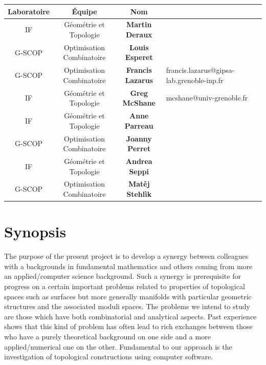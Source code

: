 \documentclass[14pt,fleqn]{article}
\begin{document}
\smallskip
\vspace{.5cm}
\begin{center}
\begin{tabular}[h]{|c|c|c|l|l|}
  \hline
 Laboratoire & Équipe & Nom \\
\hline \hline
IF & Géométrie et Topologie & {\bf Martin Deraux} &\\
\hline
G-SCOP & Optimisation Combinatoire & {\bf Louis Esperet}& \\
\hline
G-SCOP & Optimisation Combinatoire & {\bf Francis Lazarus}& 
francis.lazarus@gipsa-lab.grenoble-inp.fr\\
\hline
IF & Géométrie et Topologie & {\bf Greg McShane}&
mcshane@univ-grenoble.fr \\
\hline
IF & Géométrie et Topologie & {\bf Anne Parreau}& \\
\hline
G-SCOP & Optimisation Combinatoire & {\bf Joanny Perret}& \\
\hline
IF & Géométrie et Topologie & {\bf Andrea Seppi}& \\
\hline
G-SCOP & Optimisation Combinatoire & {\bf Mat\v{e}j Stehlìk}& \\
\hline
\end{tabular}
\end{center}

\section{Synopsis}


The purpose of the present project is to develop a synergy between colleagues with a backgrounds in fundamental mathematics  and others coming from more an applied/computer science background.
Such a synergy is prerequisite 
for progress on a certain important problems related to properties of topological spaces 
such as surfaces but more generally manifolds with particular geometric structures
and the associated moduli spaces.
The problems we intend to study
are those which have both 
combinatorial and analytical aspects. Past experience shows that
this kind of problem 
has often lead to rich exchanges between 
those  
who have a purely theoretical background 
on one side 
and a more  applied/numerical one
on the other.
Fundamental to our approach is
the investigation
of topological constructions
using computer software.
\end{document}
